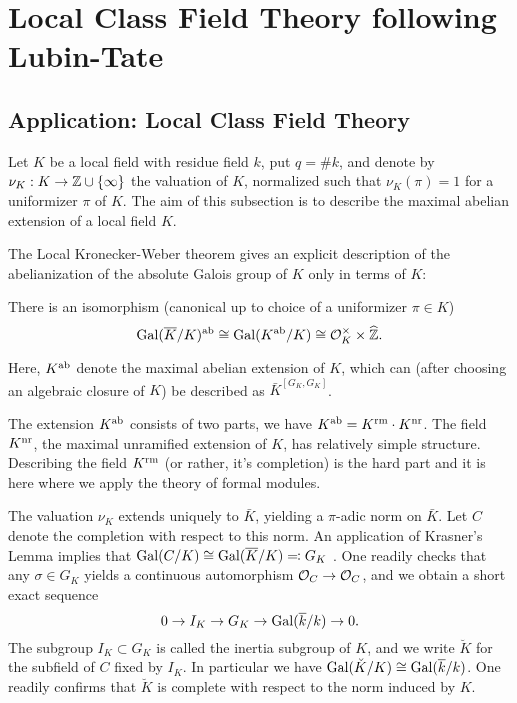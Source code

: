 \documentclass[../main.tex]{subfiles}
\begin{document}
\section{Local Class Field Theory following Lubin-Tate}



\subsection{Application: Local Class Field Theory} %
\label{sub:Application: The Local Class Field Theory}

Let $K$ be a local field with residue field $k$, put $q = \# k$, and 
denote by $\nu_K: K \to \mathbb{Z} \cup \{\infty\}$ the valuation of $K$, normalized
such that $\nu_K(\pi) = 1$ for a uniformizer $\pi$ of $K$.
The aim of this subsection is to describe the maximal abelian extension of
a local field $K$.

The Local Kronecker-Weber theorem gives an explicit description of the
abelianization of the absolute Galois group of $K$ only in terms of $K$:

\begin{thm}\label{thm:localKW}
  There is an isomorphism (canonical up to choice of a uniformizer 
  $\pi \in K$)
  \begin{equation*}
    \operatorname{Gal}(\overline K/K)^{\mathrm{ab}} \cong \operatorname{Gal}(K^{\mathrm{ab}}/K) \cong \mathcal{O}_K^\times
    \times \widehat {\mathbb{Z}}.
  \end{equation*}
\end{thm}
Here, $K^{\mathrm{ab}}$ denote the maximal abelian extension of $K$, which can (after choosing
an algebraic closure of $K$) be described as $\bar K^{[G_K, G_K]}$. 

The extension $K^{\mathrm{ab}}$ consists of two parts, we have 
$K^{\mathrm{ab}} = K^{\mathrm{rm}} \cdot K^{\mathrm{nr}}$. The field $K^{\mathrm{nr}}$, the maximal unramified extension
of $K$, has relatively simple structure. 
Describing the field $K^{\mathrm{rm}}$ (or rather, it's completion) is the hard part and
it is here where we apply the theory of formal modules.

The valuation $\nu_K$ extends uniquely to $\bar K$, yielding a
$\pi$-adic norm on $\bar K$. Let $C$ denote the completion with respect to this
norm. An application of Krasner's Lemma implies that $\operatorname{Gal}(C/K) \cong \operatorname{Gal}(\overline
K/K) \eqqcolon G_K$
. One readily checks that any $\sigma \in G_K$ yields a 
continuous automorphism $\mathcal{O}_C \to \mathcal{O}_C$, and we obtain a short exact sequence 
\begin{equation*}
  0 \to I_K \to G_K \to \operatorname{Gal}(\overline k /k) \to 0.
\end{equation*}
The subgroup $I_K \subset G_K$ is called the inertia subgroup of $K$,
and we write $\breve K$ for the subfield of $C$ fixed by $I_K$. In particular
we have $\operatorname{Gal}(\breve K /K) \cong \operatorname{Gal}(\overline k /k)$. One readily confirms that 
$\breve K$ is complete with respect to the norm induced by $K$. 
\end{document}
